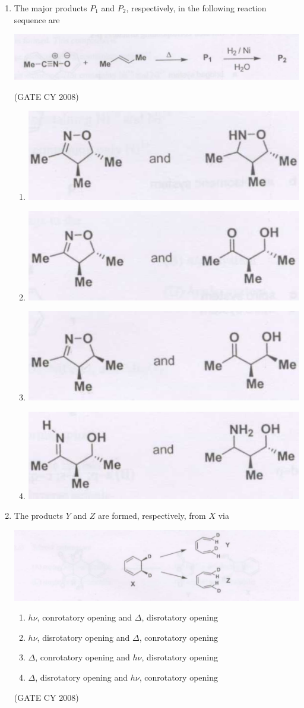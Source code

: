 \documentclass[12pt]{article}
\begin{document}
\begin{enumerate}
\item The major products $P_1$ and $P_2$, respectively, in the following reaction sequence are

\begin{center}
    \includegraphics[width=0.5\columnwidth]{figs/q39.png}
\end{center}    \hfill{(GATE CY 2008)}
\begin{enumerate}
    \item \includegraphics[width=0.3\columnwidth]{figs/q39 a.png}
    \item \includegraphics[width=0.3\columnwidth]{figs/q39 b.png}
    \item \includegraphics[width=0.3\columnwidth]{figs/q39 c.png}
    \item \includegraphics[width=0.3\columnwidth]{figs/q39 d.png}
\end{enumerate}

\item The products $Y$ and $Z$ are formed, respectively, from $X$ via

\begin{center}
    \includegraphics[width=0.8\columnwidth]{figs/q40.png}
\end{center}
\begin{enumerate}
    \item $h\nu$, conrotatory opening and $\Delta$, disrotatory opening
    \item $h\nu$, disrotatory opening and $\Delta$, conrotatory opening
    \item $\Delta$, conrotatory opening and $h\nu$, disrotatory opening
    \item $\Delta$, disrotatory opening and $h\nu$, conrotatory opening
\end{enumerate}    \hfill{(GATE CY 2008)}




\end{enumerate}
\end{document}
